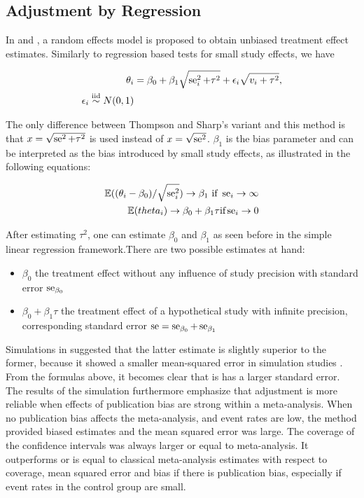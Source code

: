 \documentclass[11pt,a4paper,twoside]{book}\usepackage[]{graphicx}\usepackage[]{color}
\begin{document}
\subsection{Adjustment by Regression} \label{sec:regression.adjustment}
In \citet{limitmeta.2} and \citet{limitmeta}, a random effects model is proposed to obtain unbiased treatment effect estimates. Similarly to regression based tests for small study effects, we have

\begin{align}
\theta_i & = \beta_0 + \beta_1\sqrt{\se_i^2 + \tau^2} + \epsilon_i\sqrt{v_i + \tau^2}, \label{eq:limitmeta.regression} \\
\epsilon_i \stackrel{\textrm{iid}}{\sim} N(0,1)
\end{align}

The only difference between Thompson and Sharp's variant and this method is that $x = \sqrt{\operatorname{se}^2 + \tau^2}$ is used instead of $x = \sqrt{\operatorname{se}^2}$. $\beta_{1}$ is the bias parameter and can be interpreted as the bias introduced by small study effects, as illustrated in the following equations:

\begin{align}
\mathbb{E}((\theta_i - \beta_0)/\sqrt{\se_i^2}) \rightarrow \beta_1 \textrm{ if } \se_i \rightarrow \infty \nonumber \\ %
\mathbb{E}(theta_i) \rightarrow \beta_0 + \beta_1 \tau \textrm{if} \se_i \rightarrow 0 \nonumber
\end{align}

After estimating $\tau^2$, one can estimate $\beta_{0}$ and $\beta_{1}$ as seen before in the simple linear regression framework.There are two possible estimates at hand:
\begin{itemize}
\item $\beta_0$ the treatment effect without any influence of study precision with standard error $\operatorname{se}_{\beta_0}$
\item $\beta_0 + \beta_1 \tau$ the treatment effect of a hypothetical study with infinite precision, corresponding standard error $\operatorname{se} = \operatorname{se}_{\beta_0} + \operatorname{se}_{\beta_1}$
\end{itemize}

Simulations in \citet{limitmeta} suggested that the latter estimate is slightly superior to the former, because it showed a smaller mean-squared error in simulation studies \citet{limitmeta.2}. From the formulas above, it becomes clear that is has a larger standard error. The results of the simulation furthermore emphasize that adjustment is more reliable when effects of publication bias are strong within a meta-analysis. When no publication bias affects the meta-analysis, and event rates are low, the method provided biased estimates and the mean squared error was large. The coverage of the confidence intervals was always larger or equal to meta-analysis. It outperforms or is equal to classical meta-analysis estimates with respect to coverage, mean squared error and bias if there is publication bias, especially if event rates in the control group are small. 
\end{document}
